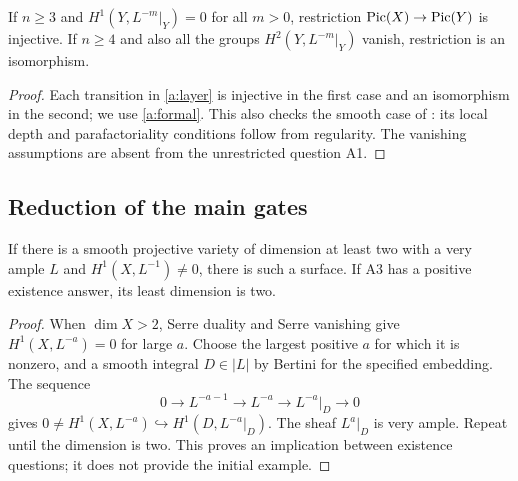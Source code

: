 \begin{corollary}
\label{a:vanishing}
If $n\geq3$ and $H^1(Y,L^{-m}|_Y)=0$ for all $m>0$, restriction
$\operatorname{Pic}(X)\to\operatorname{Pic}(Y)$ is injective.  If $n\geq4$ and also all the
groups $H^2(Y,L^{-m}|_Y)$ vanish, restriction is an isomorphism.
\end{corollary}
\begin{proof}
Each transition in \eqref{a:layer} is injective in the first case and an
isomorphism in the second; we use \eqref{a:formal}.  This also checks
the smooth case of \cite[Expos\'e XII, Corollary 3.6, p.~121]{SGA2}:
its local depth and parafactoriality conditions follow from regularity.
The vanishing assumptions are absent from the unrestricted question A1.
\end{proof}

\subsection{Reduction of the main gates}
\begin{proposition}\label{a:surface}
If there is a smooth projective variety of dimension at least two with
a very ample $L$ and $H^1(X,L^{-1})\ne0$, there is such a surface.
If A3 has a positive existence answer, its least dimension is two.
\end{proposition}
\begin{proof}
When $\dim X>2$, Serre duality and Serre vanishing give
$H^1(X,L^{-a})=0$ for large $a$.  Choose the largest positive $a$ for
which it is nonzero, and a smooth integral $D\in|L|$ by Bertini for
the specified embedding.  The sequence
\[
 0\to L^{-a-1}\to L^{-a}\to L^{-a}|_D\to0
\]
gives $0\ne H^1(X,L^{-a})\hookrightarrow H^1(D,L^{-a}|_D)$.
The sheaf $L^a|_D$ is very ample.  Repeat until the dimension is two.
This proves an implication between existence questions; it does not
provide the initial example.
\end{proof}


